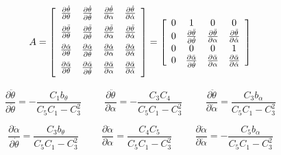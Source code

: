 \documentclass{article}
\theoremstyle{plain}
\theoremstyle{definition}
\theoremstyle{remark}
\begin{document}
$$ A = \left[ \begin{array}{c c c c l}
	\frac{\partial \dot{\theta}}{\partial \theta} & \frac{\partial \dot{\theta}}{\partial \dot{\theta}} & \frac{\partial \dot{\theta}}{\partial \alpha} & \frac{\partial \dot{\theta}}{\partial \dot{\alpha}}\\[6pt]
	\frac{\partial \ddot{\theta}}{\partial \theta} & \frac{\partial \ddot{\theta}}{\partial \dot{\theta}} & \frac{\partial \ddot{\theta}}{\partial \alpha} & \frac{\partial \ddot{\theta}}{\partial \dot{\alpha}}\\[6pt]
	\frac{\partial \dot{\alpha}}{\partial \theta} & \frac{\partial \dot{\alpha}}{\partial \dot{\theta}} & \frac{\partial \dot{\alpha}}{\partial \alpha} & \frac{\partial \dot{\alpha}}{\partial \dot{\alpha}}\\[6pt]
	\frac{\partial \ddot{\alpha}}{\partial \theta} & \frac{\partial \ddot{\alpha}}{\partial \dot{\theta}} & \frac{\partial \ddot{\alpha}}{\partial \alpha} & \frac{\partial \ddot{\alpha}}{\partial \dot{\alpha}}\\[6pt]
 \end{array} \right] = 
\left[ \begin{array}{c c c c l} 
0 & 1 & 0 & 0 \\
0 & \frac{\partial \ddot{\theta}}{\partial \dot{\theta}} & \frac{\partial \ddot{\theta}}{\partial \alpha} & \frac{\partial \ddot{\theta}}{\partial \dot{\alpha}} \\
0 & 0 & 0 & 1 \\
0 & \frac{\partial \ddot{\alpha}}{\partial \dot{\theta}} & \frac{\partial \ddot{\alpha}}{\partial \alpha} & \frac{\partial \ddot{\alpha}}{\partial \dot{\alpha}} \\
\end{array} \right]$$

$$ \frac{\partial \ddot{\theta}}{\partial \ddot{\theta}} = -\frac{C_1 b_{\theta}}{C_5 C_1 - C_3^2}  \hspace{1cm} \frac{\partial \ddot{\theta}}{\partial \alpha} = -\frac{C_3 C_4}{C_5 C_1 - C_3^2}
\hspace{1cm} \frac{\partial \ddot{\theta}}{\partial \dot{\alpha}} = \frac{C_3 b_{\alpha}}{C_5 C_1 - C_3^2}$$

$$ \frac{\partial \ddot{\alpha}}{\partial \dot{\theta}} = \frac{C_3 b_{\theta}}{C_5 C_1 - C_3^2} \hspace{1cm}  \frac{\partial \ddot{\alpha}}{\partial \alpha} = \frac{C_4 C_5}{C_5 C_1 - C_3^2} \hspace{1cm} \frac{\partial \ddot{\alpha}}{\partial \dot{\alpha}} = - \frac{C_5 b_{\alpha}}{C_5 C_1 - C_3^2}$$
\end{document}
